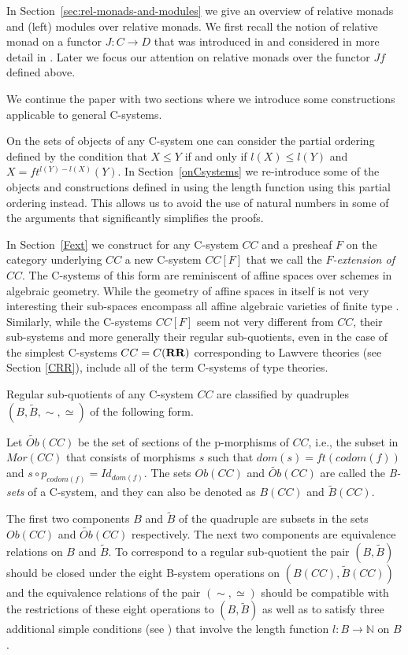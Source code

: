 \documentclass[onecolumn,12pt]{amsart}
\newcommand{\DG}[1]{}
\renewcommand{\DG}[1]{\todo[color=green!30]{DG: #1}\PackageWarning{TODO}{DG: #1}}
\numberwithin{proposition}{subsection}
\newcommand{\sr}{\rightarrow}
\newcommand{\nn}{{\mathbb N}}
\newcommand{\nat}{\nn}
\newcommand{\wt}{\widetilde}
\newcommand{\RR}{{\bf RR}}
\begin{document}
In Section~\ref{sec:rel-monads-and-modules} we give an overview of relative monads and (left) modules over relative monads.
We first recall the notion of relative monad on a
functor $J:C\sr D$ that was introduced in \cite[Def.1, p.~299]{ACU} and
considered in more detail in \cite{ACU2}.
Later we focus our attention on
relative monads over the functor $Jf$ defined above.


We continue the paper with two sections where we introduce some constructions
applicable to general C-systems.

On the sets of objects of any C-system one can consider the partial ordering
defined by the condition that $X\le Y$ if and only if $l(X)\le l(Y)$ and
$X=ft^{l(Y)-l(X)}(Y)$. In Section~\ref{onCsystems} we re-introduce some of the objects
and constructions defined in \cite{Csubsystems} using the length function using
this partial ordering instead. This allows us to avoid the use of natural numbers
in some of the arguments that significantly simplifies the proofs.

In Section~\ref{Fext} we construct for any C-system $CC$ and a presheaf $F$ on
the category underlying $CC$ a new C-system $CC[F]$ that we call the
{\em $F$-extension of $CC$}. The C-systems of this form are reminiscent of affine
spaces over schemes in algebraic geometry. While the geometry of affine spaces
in itself is not very interesting their sub-spaces encompass all affine
algebraic varieties of finite type . Similarly, while the C-systems $CC[F]$
seem not very different from $CC$, their sub-systems and more generally their
regular sub-quotients, even in the case of the simplest C-systems $CC=C(\RR)$
corresponding to Lawvere theories (see Section \ref{CRR}), include all of the
term C-systems of type theories.

Regular sub-quotients of any C-system $CC$ are classified by quadruples
$(B,\wt{B}, \sim,\simeq)$ of the following form.

Let $\wt{Ob}(CC)$ be the set of sections of the p-morphisms of $CC$, i.e., the
subset in $Mor(CC)$ that consists of morphisms $s$ such that
$dom(s)=ft(codom(f))$ and $s\circ p_{codom(f)}=Id_{dom(f)}$.  The sets $Ob(CC)$
and $\wt{Ob}(CC)$ are called the {\em B-sets} of a C-system, and they can also be denoted
as $B(CC)$ and $\wt{B}(CC)$.

The first two components $B$ and $\wt{B}$ of the quadruple are subsets in the
sets $Ob(CC)$ and $\wt{Ob}(CC)$ respectively. The next two components are
equivalence relations on $B$ and $\wt{B}$. To correspond to a regular
sub-quotient the pair $(B,\wt{B})$ should be closed under the eight B-system
operations on $(B(CC),\wt{B}(CC))$ and the equivalence relations of the pair
$(\sim,\simeq)$ should be compatible with the restrictions of these eight
operations to $(B,\wt{B})$ as well as to satisfy three additional simple
conditions %
(see \cite[Proposition 5.4]{Csubsystems}) that involve the length
function $l:B\sr\nat$ on $B$.
\end{document}
